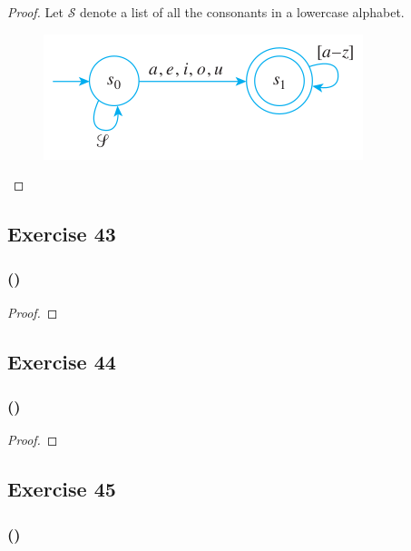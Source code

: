 \documentclass[14pt]{extarticle}
\begin{document}
\begin{proof}
Let \(\mathscr{S}\) denote a list of all the consonants in a lowercase alphabet.

\begin{figure}[ht!]
\centering
\includegraphics[scale=0.5]{../images/12.2.42.png}
\end{figure}
\end{proof}

\subsection{Exercise 43}

\subsubsection{()}

\begin{proof}

\end{proof}

\subsection{Exercise 44}

\subsubsection{()}

\begin{proof}

\end{proof}

\subsection{Exercise 45}

\subsubsection{()}
\end{document}
